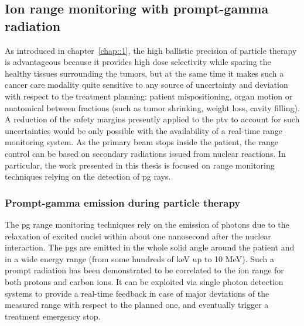 \subsection{Ion range monitoring with prompt-gamma radiation}\label{chap2::sec::PGionRangeMonitoring}

As introduced in chapter~\ref{chap::1}, the high ballistic precision of particle therapy is advantageous because it provides high dose selectivity while sparing the healthy tissues surrounding the tumors, but at the same time it makes such a cancer care modality quite sensitive to any source of uncertainty and deviation with respect to the treatment planning: patient mispositioning, organ motion or anatomical between fractions (such as tumor shrinking, weight loss, cavity filling). A reduction of the safety margins presently applied to the \gls{ptv} to account for such uncertainties would be only possible with the availability of a real-time range monitoring system. As the primary beam stops inside the patient, the range control can be based on secondary radiations issued from nuclear reactions. In particular, the work presented in this thesis is focused on range monitoring techniques relying on the detection of \gls{pg} rays.
 
\subsubsection{Prompt-gamma emission during particle therapy}\label{chap2::subsec::PGproduction}

The \gls{pg} range monitoring techniques rely on the emission of photons due to the relaxation of excited nuclei within about one nanosecond after the nuclear interaction. The \glspl{pg} are emitted in the whole solid angle around the patient and in a wide energy range (from some hundreds of keV up to 10 MeV). Such a prompt radiation has been demonstrated to be correlated to the ion range for both protons and carbon ions. It can be exploited via single photon detection systems to provide a real-time feedback in case of major deviations of the measured range with respect to the planned one, and eventually trigger a treatment emergency stop.

